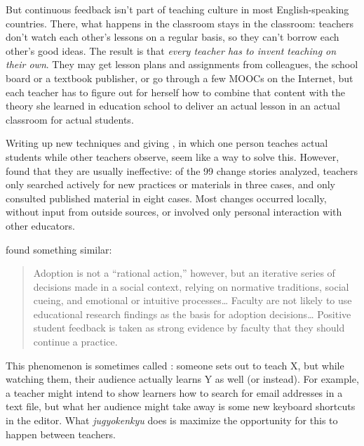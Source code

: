 But continuous feedback isn't part of teaching culture in most
English-speaking countries. There, what happens in the classroom stays
in the classroom: teachers don't watch each other's lessons on a
regular basis, so they can't borrow each other's good ideas. The
result is that \emph{every teacher has to invent teaching on their
  own}. They may get lesson plans and assignments from colleagues, the
school board or a textbook publisher, or go through a few MOOCs on the
Internet, but each teacher has to figure out for herself how to
combine that content with the theory she learned in education school
to deliver an actual lesson in an actual classroom for actual
students.

Writing up new techniques and giving
, in which one
person teaches actual students while other teachers observe, seem like
a way to solve this.  However, \cite{Finc2007,Finc2012} found that
they are usually ineffective: of the 99 change stories analyzed,
teachers only searched actively for new practices or materials in
three cases, and only consulted published material in eight cases.
Most changes occurred locally, without input from outside sources, or
involved only personal interaction with other educators.

\noindent
\cite{Bark2015} found something similar:

\begin{quote}

  Adoption is not a ``rational action,'' however, but an iterative
  series of decisions made in a social context, relying on normative
  traditions, social cueing, and emotional or intuitive
  processes{\ldots} Faculty are not likely to use educational research
  findings as the basis for adoption decisions{\ldots} Positive
  student feedback is taken as strong evidence by faculty that they
  should continue a practice.

\end{quote}

This phenomenon is sometimes called
:
someone sets out to teach X, but while watching them, their audience
actually learns Y as well (or instead). For example, a teacher might
intend to show learners how to search for email addresses in a text
file, but what her audience might take away is some new keyboard
shortcuts in the editor.  What \emph{jugyokenkyu} does is maximize the
opportunity for this to happen between teachers.

